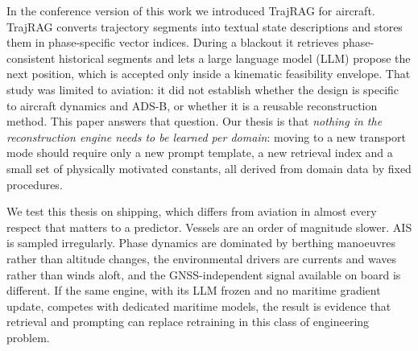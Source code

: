 In the conference version of this work \citep{felendler2026trajrag} we
introduced TrajRAG for aircraft. TrajRAG converts trajectory segments into
textual state descriptions and stores them in phase-specific vector indices.
During a blackout it retrieves phase-consistent historical segments and lets
a large language model (LLM) propose the next position, which is accepted
only inside a kinematic feasibility envelope. That study was limited to
aviation: it did not establish whether the design is specific to aircraft
dynamics and ADS-B, or whether it is a reusable reconstruction method. This
paper answers that question. Our thesis is that \emph{nothing in the
reconstruction engine needs to be learned per domain}: moving to a new
transport mode should require only a new prompt template, a new retrieval
index and a small set of physically motivated constants, all derived from
domain data by fixed procedures.

We test this thesis on shipping, which differs from aviation in almost
every respect that matters to a predictor. Vessels are an order of
magnitude slower. AIS is sampled irregularly. Phase dynamics are dominated
by berthing manoeuvres rather than altitude changes, the environmental
drivers are currents and waves rather than winds aloft, and the
GNSS-independent signal available on board is different. If the same
engine, with its LLM frozen and no maritime gradient update, competes with
dedicated maritime models, the result is evidence that retrieval and
prompting can replace retraining in this class of engineering problem.

